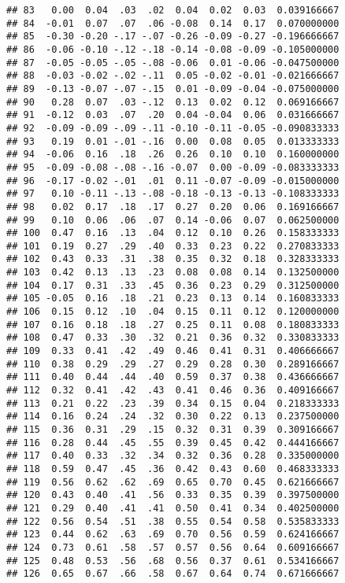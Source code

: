\documentclass[]{article}
\begin{document}
\begin{verbatim}
## 83   0.00  0.04  .03  .02  0.04  0.02  0.03  0.039166667
## 84  -0.01  0.07  .07  .06 -0.08  0.14  0.17  0.070000000
## 85  -0.30 -0.20 -.17 -.07 -0.26 -0.09 -0.27 -0.196666667
## 86  -0.06 -0.10 -.12 -.18 -0.14 -0.08 -0.09 -0.105000000
## 87  -0.05 -0.05 -.05 -.08 -0.06  0.01 -0.06 -0.047500000
## 88  -0.03 -0.02 -.02 -.11  0.05 -0.02 -0.01 -0.021666667
## 89  -0.13 -0.07 -.07 -.15  0.01 -0.09 -0.04 -0.075000000
## 90   0.28  0.07  .03 -.12  0.13  0.02  0.12  0.069166667
## 91  -0.12  0.03  .07  .20  0.04 -0.04  0.06  0.031666667
## 92  -0.09 -0.09 -.09 -.11 -0.10 -0.11 -0.05 -0.090833333
## 93   0.19  0.01 -.01 -.16  0.00  0.08  0.05  0.013333333
## 94  -0.06  0.16  .18  .26  0.26  0.10  0.10  0.160000000
## 95  -0.09 -0.08 -.08 -.16 -0.07  0.00 -0.09 -0.083333333
## 96  -0.17 -0.02 -.01  .01  0.11 -0.07 -0.09 -0.015000000
## 97   0.10 -0.11 -.13 -.08 -0.18 -0.13 -0.13 -0.108333333
## 98   0.02  0.17  .18  .17  0.27  0.20  0.06  0.169166667
## 99   0.10  0.06  .06  .07  0.14 -0.06  0.07  0.062500000
## 100  0.47  0.16  .13  .04  0.12  0.10  0.26  0.158333333
## 101  0.19  0.27  .29  .40  0.33  0.23  0.22  0.270833333
## 102  0.43  0.33  .31  .38  0.35  0.32  0.18  0.328333333
## 103  0.42  0.13  .13  .23  0.08  0.08  0.14  0.132500000
## 104  0.17  0.31  .33  .45  0.36  0.23  0.29  0.312500000
## 105 -0.05  0.16  .18  .21  0.23  0.13  0.14  0.160833333
## 106  0.15  0.12  .10  .04  0.15  0.11  0.12  0.120000000
## 107  0.16  0.18  .18  .27  0.25  0.11  0.08  0.180833333
## 108  0.47  0.33  .30  .32  0.21  0.36  0.32  0.330833333
## 109  0.33  0.41  .42  .49  0.46  0.41  0.31  0.406666667
## 110  0.38  0.29  .29  .27  0.29  0.28  0.30  0.289166667
## 111  0.40  0.44  .44  .40  0.59  0.37  0.38  0.436666667
## 112  0.32  0.41  .42  .43  0.41  0.46  0.36  0.409166667
## 113  0.21  0.22  .23  .39  0.34  0.15  0.04  0.218333333
## 114  0.16  0.24  .24  .32  0.30  0.22  0.13  0.237500000
## 115  0.36  0.31  .29  .15  0.32  0.31  0.39  0.309166667
## 116  0.28  0.44  .45  .55  0.39  0.45  0.42  0.444166667
## 117  0.40  0.33  .32  .34  0.32  0.36  0.28  0.335000000
## 118  0.59  0.47  .45  .36  0.42  0.43  0.60  0.468333333
## 119  0.56  0.62  .62  .69  0.65  0.70  0.45  0.621666667
## 120  0.43  0.40  .41  .56  0.33  0.35  0.39  0.397500000
## 121  0.29  0.40  .41  .41  0.50  0.41  0.34  0.402500000
## 122  0.56  0.54  .51  .38  0.55  0.54  0.58  0.535833333
## 123  0.44  0.62  .63  .69  0.70  0.56  0.59  0.624166667
## 124  0.73  0.61  .58  .57  0.57  0.56  0.64  0.609166667
## 125  0.48  0.53  .56  .68  0.56  0.37  0.61  0.534166667
## 126  0.65  0.67  .66  .58  0.67  0.64  0.74  0.671666667

\end{verbatim}
\end{document}
